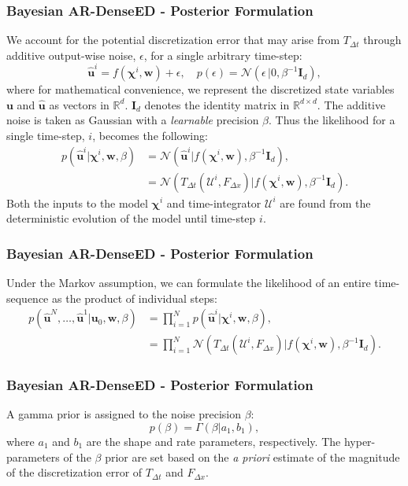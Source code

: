 \documentclass{beamer}
\theoremstyle{remark}
\begin{document}
\begin{frame}
\frametitle{Bayesian AR-DenseED - Posterior Formulation}
We account for the potential discretization error that may arise from $T_{\Delta t}$ through additive output-wise noise, $\epsilon$, for a single arbitrary time-step:
\begin{equation}
    \hat{\bm{u}}^{i} = f\left(\bm{\chi}^{i},\textbf{w}\right) + \epsilon, \quad p\left(\epsilon\right)= \mathcal{N}\left(\epsilon\,|0,\beta^{-1}\bm{I}_{d}\right),
\end{equation}
where for mathematical convenience, we represent the discretized state variables $\bm{u}$ and $\hat{\bm{u}}$ as vectors in $\mathbb{R}^{d}$.
$\bm{I}_{d}$ denotes the identity matrix in $\mathbb{R}^{d\times d}$.
The additive noise is taken as Gaussian with a \textit{learnable} precision $\beta$.
Thus the likelihood for a single time-step, $i$, becomes the following:
\begin{align}
   p\left(\hat{\bm{u}}^{i}|\bm{\chi}^{i},\textbf{w}, \beta\right)&=\mathcal{N}\left(\hat{\bm{u}}^{i}|f\left(\bm{\chi}^{i},\textbf{w}\right), \beta^{-1}\bm{I}_{d}\right), \nonumber\\
   &=\mathcal{N}\left(T_{\Delta t}\left(\bm{\mathcal{U}}^{i}, F_{\Delta x}\right)|f\left(\bm{\chi}^{i},\textbf{w}\right), \beta^{-1}\bm{I}_{d}\right).
\end{align}
Both the inputs to the model $\bm{\chi}^{i}$  and time-integrator $\bm{\mathcal{U}}^{i}$ are found from the deterministic evolution of the model until time-step $i$.
\end{frame}

\begin{frame}
\frametitle{Bayesian AR-DenseED - Posterior Formulation}
Under the Markov assumption, we can formulate the likelihood of an entire time-sequence as the product of individual steps:
\begin{align}
    p\left(\hat{\bm{u}}^{N}, \ldots, \hat{\bm{u}}^{1}|\bm{u}_{0},\textbf{w}, \beta\right) &= \prod_{i=1}^{N}p\left(\hat{\bm{u}}^{i}| \bm{\chi}^{i},\textbf{w}, \beta\right), \nonumber \\
    &= \prod_{i=1}^{N}\mathcal{N}\left(T_{\Delta t}\left(\bm{\mathcal{U}}^{i}, F_{\Delta x}\right)| f\left(\bm{\chi}^{i},\textbf{w}\right), \beta^{-1}\bm{I}_{d}\right). \label{eq:likelihood}
\end{align}
\end{frame}


\begin{frame}
\frametitle{Bayesian AR-DenseED - Posterior Formulation}
A gamma prior is assigned to the noise precision $\beta$:
\begin{equation}
    p(\beta)=\Gamma\left(\beta|a_{1},b_{1}\right),
\end{equation}
where $a_{1}$ and $b_{1}$ are the shape and rate parameters, respectively.
The hyper-parameters of the $\beta$ prior are set based on the \textit{a priori} estimate of the magnitude of the discretization error of $T_{\Delta t}$ and  $F_{\Delta x}$.

\end{frame}
\end{document}
